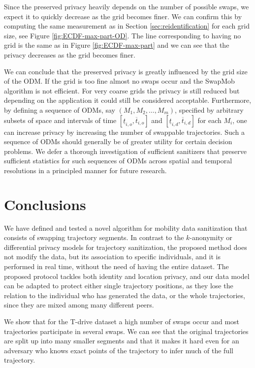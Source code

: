 \documentclass[review]{elsarticle}
\begin{document}
Since the preserved privacy heavily depends on the number of possible
swaps, we expect it to quickly decrease as the grid becomes finer. We
can confirm this by computing the same measurement as in Section
\ref{sec:reidentification} for each grid size, see Figure
\ref{fig:ECDF-max-part-OD}. The line corresponding to having no grid
is the same as in Figure \ref{fig:ECDF-max-part} and we can see that
the privacy decreases as the grid becomes finer.

We can conclude that the preserved privacy is greatly influenced by
the grid size of the ODM. If the grid is too fine almost no swaps occur
and the SwapMob algorithm is not efficient. For very coarse grids the
privacy is still reduced but depending on the application it could still
be considered acceptable.  
Furthermore, by defining a sequence of ODMs, say $(M_1,M_2,\ldots,M_m)$, specified by arbitrary subsets of space 
and intervals of time $[\underline{t}_{i,o},\overline{t}_{i,o}]$ and $[\underline{t}_{i,d},\overline{t}_{i,d}]$ for each $M_i$, one can increase privacy by increasing the number of swappable trajectories. Such a sequence of ODMs should generally be of greater utility for certain decision problems. We defer a thorough investigation of sufficient sanitizers that preserve sufficient statistics for such sequences of ODMs across spatial and temporal resolutions in a principled manner for future research.  

\section{Conclusions}\label{Sec:conclusions}

We have defined and tested a novel algorithm for mobility data \linebreak
sanitization that consists of swapping trajectory segments. In contrast to the $k$-anonymity or differential privacy models for trajectory sanitization, the proposed method does not modify the data, but its association to specific individuals, and it is performed in real time, without the need of having the entire dataset.
The proposed protocol tackles both identity and location privacy,
and our data model can be adapted to protect either single trajectory positions, as they lose the relation to the individual who has generated the data, or the whole trajectories, since they are mixed among many different peers.

We show that for the T-drive dataset a high number of swaps occur and
most trajectories participate in several swaps. We can see that the
original trajectories are split up into many smaller segments and that
it makes it hard even for an adversary who knows exact points of the
trajectory to infer much of the full trajectory. 
\end{document}

